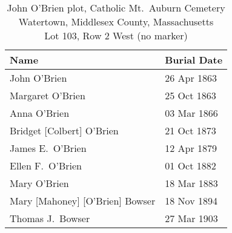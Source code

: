 \begin{table}[ht]
	\centering
	\caption{John O'Brien plot, Catholic Mt.\ Auburn Cemetery\cite{BillMcEvoy:5} \\
		Watertown, Middlesex County, Massachusetts\\
		Lot 103, Row 2 West (no marker)}
	\begin{tabular}{|l|l|}
		\hline
		\textbf{Name} & \textbf{Burial Date} \\
		\hline
		John O'Brien\index{O'Brien!John\textsuperscript{2}} & 26 Apr 1863 \\
		\hline
		Margaret O'Brien\index{O'Brien!Margaret\textsuperscript{3} (1862--1863)} & 25 Oct 1863 \\
		\hline
		Anna O'Brien\index{O'Brien!Anna\textsuperscript{3}} & 03 Mar 1866 \\
		\hline
		Bridget [Colbert] O'Brien\index{Colbert!Bridget}\index{O'Brien!Bridget (Colbert)} & 21 Oct 1873 \\
		\hline
		James E.\ O'Brien\index{O'Brien!James Edward\textsuperscript{3}} & 12 Apr 1879 \\
		\hline
		Ellen F.\ O'Brien\index{O'Brien!Ellen/Nellie\textsuperscript{3} (1859--1882)} & 01 Oct 1882 \\
		\hline
		Mary O'Brien\index{O'Brien!Mary\textsuperscript{3} (1856--1883)} & 18 Mar 1883 \\
		\hline
		Mary [Mahoney] [O'Brien] Bowser\index{Mahoney/Mahony!Mary}\index{O'Brien!Mary (Mahoney)}\index{Bowser!Mary (Mahoney) (O'Brien)} & 18 Nov 1894 \\
		\hline
		Thomas J.\ Bowser\index{Bowser!Thomas} & 27 Mar 1903 \\
		\hline
	\end{tabular}
\end{table}

